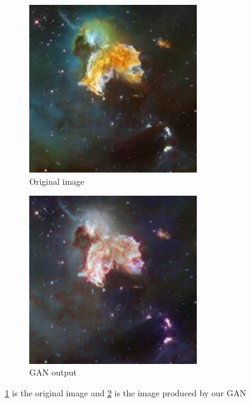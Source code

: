 \documentclass[10pt,twocolumn,letterpaper]{article}
\begin{document}
\begin{figure}[!htb]
    	\centering
    	\begin{subfigure}[b]{0.15\textwidth}
    		\centering
    		\includegraphics[width=0.8\textwidth]{figures/original_sample}
    		\caption{Original image}
    		\label{fig: original_sample}
    	\end{subfigure}
    	\begin{subfigure}[b]{0.15\textwidth}
    		\centering
    		\includegraphics[width=0.8\textwidth]{figures/GAN_output_sample}
    		\caption{GAN output}
    		\label{fig: gan_output_sample}
    	\end{subfigure}
    	\caption{\cref{fig: original_sample} is the original image and \cref{fig: gan_output_sample} is the image produced by our GAN}
    	\label{fig: sample_comp}
\end{figure}
\end{document}
